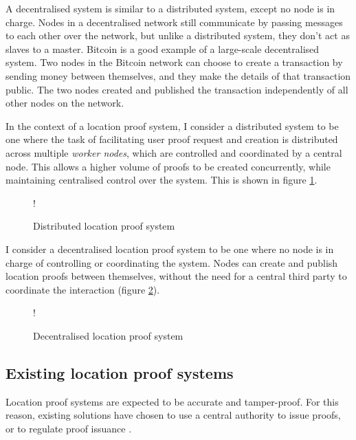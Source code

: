 A decentralised system is similar to a distributed system, except no node is in charge. Nodes in a decentralised network still communicate by passing messages to each other over the network, but unlike a distributed system, they don't act as slaves to a master. Bitcoin \cite{bitcoin} is a good example of a large-scale decentralised system. Two nodes in the Bitcoin network can choose to create a transaction by sending money between themselves, and they make the details of that transaction public. The two nodes created and published the transaction independently of all other nodes on the network.

In the context of a location proof system, I consider a distributed system to be one where the task of facilitating user proof request and creation is distributed across multiple \textit{worker nodes}, which are controlled and coordinated by a central node. This allows a higher volume of proofs to be created concurrently, while maintaining centralised control over the system. This is shown in figure \ref{fig:distributed_location}.

\begin{figure}[H]
\begin{center}
 {!} {}
\end{center}
\caption{Distributed location proof system}
\label{fig:distributed_location}
\end{figure}

I consider a decentralised location proof system to be one where no node is in charge of controlling or coordinating the system. Nodes can create and publish location proofs between themselves, without the need for a central third party to coordinate the interaction (figure \ref{fig:decentralised_location}).

\begin{figure}[H]
\begin{center}
 {!} {}
\end{center}
\caption{Decentralised location proof system}
\label{fig:decentralised_location}
\end{figure}

\subsection{Existing location proof systems} \label{ssec:proof_systems}
Location proof systems are expected to be accurate and tamper-proof. For this reason, existing solutions have chosen to use a central authority to issue proofs, or to regulate proof issuance \cite{brassil, luo, khan}.

